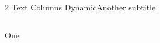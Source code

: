  \begin{frame}{2 Text Columns Dynamic}{Another subtitle}

        \begin{columns}

           { \flushleft \Huge  One\par}




        \end{columns}
    
  \end{frame}

